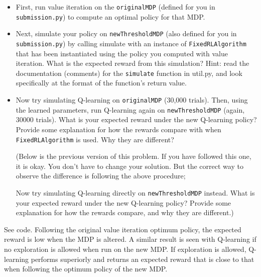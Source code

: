 \documentclass[10pt]{article}
\begin{document}
\begin{enumerate}[label=(\alph*)]
	\begin{itemize}
		\item First, run value iteration on the \texttt{originalMDP} (defined for you in \texttt{submission.py}) to compute an optimal policy for that MDP.
		\item Next, simulate your policy on \texttt{newThresholdMDP} (also defined for you in \texttt{submission.py}) by calling simulate with an instance of \texttt{FixedRLAlgorithm} that has been instantiated using the policy you computed with value iteration. What is the expected reward from this simulation? Hint: read the documentation (comments) for the \texttt{simulate} function in util.py, and look specifically at the format of the function's return value.
		\item Now try simulating Q-learning on \texttt{originalMDP} (30,000 trials). Then, using the learned parameters, run Q-learning again on \texttt{newThresholdMDP} (again, 30000 trials). What is your expected reward under the new Q-learning policy? Provide some explanation for how the rewards compare with when \texttt{FixedRLAlgorithm} is used. Why they are different?
		
		(Below is the previous version of this problem. If you have followed this one, it is okay. You don't have to change your solution. But the correct way to observe the difference is following the above procedure;

		Now try simulating Q-learning directly on \texttt{newThresholdMDP} instead. What is your expected reward under the new Q-learning policy? Provide some explanation for how the rewards compare, and why they are different.) 
	\end{itemize}
	
	See code. Following the original value iteration optimum policy, the expected reward is low when the MDP is altered. A similar result is seen with Q-learning if no exploration is allowed when run on the new MDP. If exploration is allowed, Q-learning performs superiorly and returns an expected reward that is close to that when following the optimum policy of the new MDP.
		
\end{enumerate}
\end{document}
